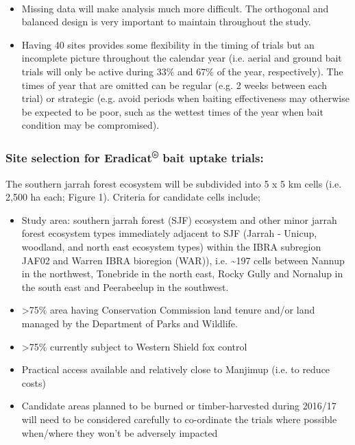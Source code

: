 \documentclass[version=last,
    paper=a4,                               %
    10pt,                                   %
    dvipsnames,
    oneside,                              %
    headings=openany,                       %
    open=any,
    BCOR=7mm,                               %
    DIV=15,     %
]{scrbook}
\begin{document}
~

\begin{itemize}
\itemsep1pt\parskip0pt
\item
  Missing data will make analysis much more difficult. The orthogonal
  and balanced design is very important to maintain throughout the
  study.
\end{itemize}

\begin{itemize}
\itemsep1pt\parskip0pt
\item
  Having 40 sites provides some flexibility in the timing of trials but
  an incomplete picture throughout the calendar year (i.e. aerial and
  ground bait trials will only be active during 33\% and 67\% of the
  year, respectively). The times of year that are omitted can be regular
  (e.g. 2 weeks between each trial) or strategic (e.g. avoid periods
  when baiting effectiveness may otherwise be expected to be poor, such
  as the wettest times of the year when bait condition may be
  compromised).
\end{itemize}

\subsubsection{Site selection for Eradicat\textsuperscript{®} bait
uptake trials:}

The southern jarrah forest ecosystem will be subdivided into 5 x 5 km
cells (i.e. 2,500 ha each; Figure 1). Criteria for candidate cells
include;

\begin{itemize}
\itemsep1pt\parskip0pt
\item
  Study area: southern jarrah forest (SJF) ecosystem and other minor
  jarrah forest ecosystem types immediately adjacent to SJF (Jarrah -
  Unicup, woodland, and north east ecosystem types) within the IBRA
  subregion JAF02 and Warren IBRA bioregion (WAR)), i.e.
  \textasciitilde{}197 cells between Nannup in the northwest, Tonebride
  in the north east, Rocky Gully and Nornalup in the south east and
  Peerabeelup in the southwest.
\item
  \textgreater{}75\% area having Conservation Commission land tenure
  and/or land managed by the Department of Parks and Wildlife.
\item
  \textgreater{}75\% currently subject to Western Shield fox control
\item
  Practical access available and relatively close to Manjimup (i.e. to
  reduce costs)
\item
  Candidate areas planned to be burned or timber-harvested during
  2016/17 will need to be considered carefully to co-ordinate the trials
  where possible when/where they won't be adversely impacted
\end{itemize}
\end{document}
